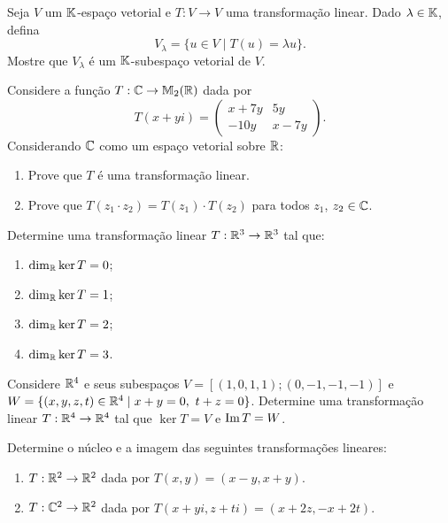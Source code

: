 \documentclass[12pt]{exam}
\begin{document}
\begin{exercicio}
  Seja $V$ um $\mathbb{K}$-espa\c{c}o vetorial e $T : V \to V$ uma transforma\c{c}\~ao linear. Dado $\lambda \in \mathbb{K}$, defina
  \[
  V_\lambda = \{ u \in V \mid T(u) = \lambda u\}.
  \]
  Mostre que $V_\lambda$ \'e um $\mathbb{K}$-subespa\c{c}o vetorial de $V$.
\end{exercicio}

\begin{exercicio}
  Considere a fun\c{c}\~ao $T : \mathbb{C} \to \mathbb{M}_2(\mathbb{R})$ dada por
  \[
  T(x + yi) = \begin{pmatrix}
    x + 7y & 5y\\
    -10y & x - 7y
  \end{pmatrix}.
  \]
  Considerando $\mathbb{C}$ como um espa\c{c}o vetorial sobre $\mathbb{R}$:
  \begin{enumerate}[label=({\alph*})]
    \item Prove que $T$ \'e uma transforma\c{c}\~ao linear.
    \item Prove que $T(z_1\cdot z_2) = T(z_1)\cdot T(z_2)$ para todos $z_1$, $z_2 \in \mathbb{C}$.
  \end{enumerate}
\end{exercicio}

\begin{exercicio}
  Determine uma transforma\c{c}\~ao linear $T : \mathbb{R}^3 \to \mathbb{R}^3$ tal que:
  \begin{enumerate}[label=({\alph*})]
    \item $\dim_{\mathbb{R}} \ker T = 0$;
    \item $\dim_{\mathbb{R}} \ker T = 1$;
    \item $\dim_{\mathbb{R}} \ker T = 2$;
    \item $\dim_{\mathbb{R}} \ker T = 3$.
  \end{enumerate}
\end{exercicio}

\begin{exercicio}
  Considere $\mathbb{R}^4$ e seus subespa\c{c}os $V = [(1,0,1,1);(0,-1,-1,-1)]$ e $W = \{(x,y,z,t) \in \mathbb{R}^4 \mid x + y = 0,\ t + z = 0\}$. Determine uma transforma\c{c}\~ao linear $T : \mathbb{R}^4 \to \mathbb{R}^4$ tal que $\ker T = V$ e ${\rm Im\,} T = W$.
\end{exercicio}

\begin{exercicio}
  Determine o n\'ucleo e a imagem das seguintes transforma\c{c}\~oes lineares:
  \begin{enumerate}[label=({\alph*})]
    \item $T : \mathbb{R}^2 \to \mathbb{R}^2$ dada por $T(x,y) = (x - y, x + y)$.
    \item $T : \mathbb{C}^2 \to \mathbb{R}^2$ dada por $T(x + yi,z + ti) = (x + 2z, -x + 2t)$.
  \end{enumerate}
\end{exercicio}
\end{document}
